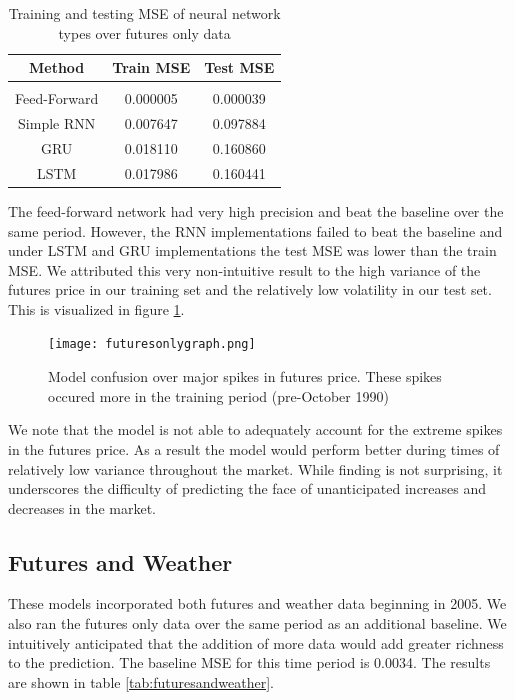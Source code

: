 \documentclass[twoside,11pt]{article}
\begin{document}
\begin{table}[h!]
	\begin{center}
		\begin{tabular}{ccc}
		    Method & Train MSE & Test MSE \\
		\hline \\[-11pt]
		Feed-Forward & 0.000005 & 0.000039 \\
		Simple RNN & 0.007647 & 0.097884 \\ 
	    GRU & 0.018110 & 0.160860 \\
		LSTM & 0.017986 & 0.160441 \\
		\hline
		\end{tabular}
	  \label{tab:futuresonly}
		\caption{Training and testing MSE of neural network types over futures only data}
	\end{center}
\end{table}

The feed-forward network had very high precision and beat the baseline over the same period. However, the RNN implementations failed to beat the baseline and under LSTM and GRU implementations the test MSE was lower than the train MSE. We attributed this very non-intuitive result to the high variance of the futures price in our training set and the relatively low volatility in our test set. This is visualized in figure \ref{fig:futuresonlygraph}. 


\begin{figure}[htbp]
	\centering
	\texttt{[image: futuresonlygraph.png]}
	\caption{Model confusion over major spikes in futures price. These spikes occured more in the training period (pre-October 1990) }
	\label{fig:futuresonlygraph}
\end{figure}

We note that the model is not able to adequately account for the extreme spikes in the futures price. As a result the model would perform better during times of relatively low variance throughout the market. While finding is not surprising, it underscores the difficulty of predicting the face of unanticipated increases and decreases in the market.   

\subsection{Futures and Weather}

These models incorporated both futures and weather data beginning in 2005. We also ran the futures only data over the same period as an additional baseline. We intuitively anticipated that the addition of more data would add greater richness to the prediction. The baseline MSE for this time period is 0.0034. The results are shown in table \ref{tab:futuresandweather}.
\end{document}
